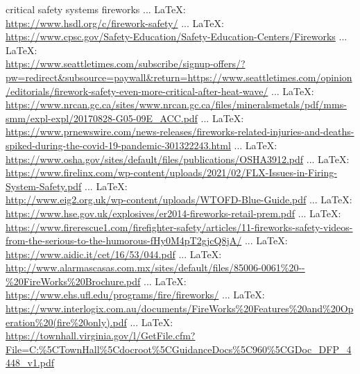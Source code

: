 \begin{thebibliography}{99}
{{{	
	critical safety systems fireworks
	 ... \LaTeX:\\ \url{https://www.hsdl.org/c/firework-safety/}
	 ... \LaTeX:\\ \url{https://www.cpsc.gov/Safety-Education/Safety-Education-Centers/Fireworks}
	 ... \LaTeX:\\ \url{https://www.seattletimes.com/subscribe/signup-offers/?pw=redirect&subsource=paywall&return=https://www.seattletimes.com/opinion/editorials/firework-safety-even-more-critical-after-heat-wave/}
	 ... \LaTeX:\\ \url{https://www.nrcan.gc.ca/sites/www.nrcan.gc.ca/files/mineralsmetals/pdf/mms-smm/expl-expl/20170828-G05-09E_ACC.pdf}
	 ... \LaTeX:\\ \url{https://www.prnewswire.com/news-releases/fireworks-related-injuries-and-deaths-spiked-during-the-covid-19-pandemic-301322243.html}
	 ... \LaTeX:\\ \url{https://www.osha.gov/sites/default/files/publications/OSHA3912.pdf}
	 ... \LaTeX:\\ \url{https://www.firelinx.com/wp-content/uploads/2021/02/FLX-Issues-in-Firing-System-Safety.pdf}
	 ... \LaTeX:\\ \url{http://www.eig2.org.uk/wp-content/uploads/WTOFD-Blue-Guide.pdf}
	 ... \LaTeX:\\ \url{https://www.hse.gov.uk/explosives/er2014-fireworks-retail-prem.pdf}
	 ... \LaTeX:\\ \url{https://www.firerescue1.com/firefighter-safety/articles/11-fireworks-safety-videos-from-the-serious-to-the-humorous-fHy0M4pT2gjcQ8jA/}
	 ... \LaTeX:\\ \url{https://www.aidic.it/cet/16/53/044.pdf}
	 ... \LaTeX:\\ \url{http://www.alarmascasas.com.mx/sites/default/files/85006-0061%20--%20FireWorks%20Brochure.pdf}
	 ... \LaTeX:\\ \url{https://www.ehs.ufl.edu/programs/fire/fireworks/}
	 ... \LaTeX:\\ \url{https://www.interlogix.com.au/documents/FireWorks%20Features%20and%20Operation%20(fire%20only).pdf}
	 ... \LaTeX:\\ \url{https://townhall.virginia.gov/l/GetFile.cfm?File=C:%5CTownHall%5Cdocroot%5CGuidanceDocs%5C960%5CGDoc_DFP_4448_v1.pdf}
}}}
\end{thebibliography}
